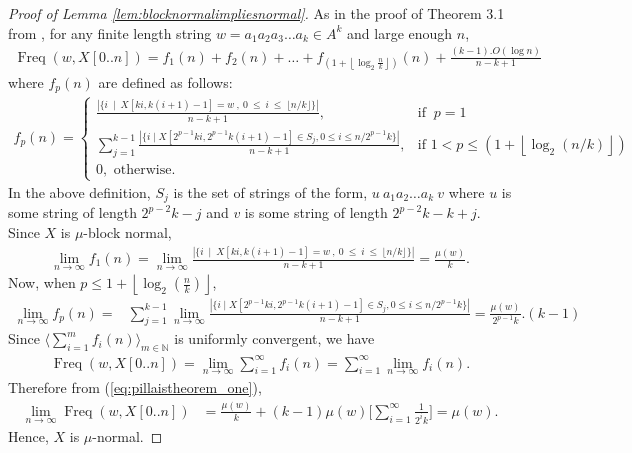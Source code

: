\documentclass[11pt]{article}
\DeclareMathOperator{\freq}{Freq}
\begin{document}
\begin{proof}[Proof of Lemma \ref{lem:blocknormalimpliesnormal}]
As in the proof of Theorem 3.1 from \cite{NandakumarPVV2021}, for any finite length string
	$w=a_1a_2a_3\dots a_k\in A^k$ and large enough $n$, 
	\begin{align}
		\label{eq:pillaistheorem_one}
		\freq(w,X[0..n])=
		f_1(n) + f_2(n) +\dots+
		f_{(1+\left \lfloor\log_2  \frac{n}{k} \right \rfloor)}(n) + {\frac{(k-1). O(\log n) }{n-k+1}}
	\end{align}
	where $f_p(n)$ are defined as follows:
	\begin{align*}
		f_{p}(n)= \begin{cases}
		\frac{	|\{i~ \mid~ X[ki,k(i+1)-1]=w
				~,~ 0 ~\leq ~i ~\leq ~\lfloor n/k \rfloor \}|}{n-k+1}, & \text{if } ~p=1\\
			\sum_{j=1}^{k-1}\frac{  |\{i \mid X[2^{p-1}ki,2^{p-1}k(i+1)-1] \in S_j
				, 0 \leq i \leq n/2^{p-1}k \}|}{n-k+1}, &\text{if } 1<p \leq
			(1+\left \lfloor\log_2(n/k)\right \rfloor)\\ 
			0, \text{ otherwise.}
		\end{cases}
	\end{align*}
	In the above definition, $S_{j}$ is the set of strings of the form,
	$u\ a_1a_2 \dots a_k\ v$ where $u$ is some string of length $2^{p-2}k-j$ and $v$ is some string of length $2^{p-2}k-k+j$. 
	Since $X$ is $\mu$-block normal, 
	\begin{align*}
		\lim_{n\to\infty} f_1(n) = \lim_{n\to\infty}\frac{	|\{i~ \mid~ X[ki,k(i+1)-1]=w
				~,~ 0 ~\leq ~i ~\leq ~\lfloor n/k \rfloor \}|}{n-k+1} =
	\frac{\mu(w)}{k}.
	\end{align*}
	Now, when $p \leq 1+ \left\lfloor\log_2(\frac{n}{k}) \right\rfloor$,
	\begin{align*}
		\lim_{n\to\infty} f_p(n)
		=&  \sum_{j =1}^{k-1}\lim_{n\to\infty}
		\frac{  |\{i \mid X[2^{p-1}ki,2^{p-1}k(i+1)-1] \in S_j
				, 0 \leq i \leq n/2^{p-1}k \}|}{n-k+1}= \frac{\mu(w)}{2^{p-1}k}.(k-1)
	\end{align*}
	Since
	$\langle \sum_{i=1}^{m} f_i(n) \rangle_{m \in \mathbb{N}}$ is uniformly
	convergent, we have
\begin{align*}
		\freq(w,X[0..n]) = \lim_{n\to\infty} \sum_{i=1}^{\infty} f_{i}(n)=  \sum_{i=1}^{\infty} \lim_{n\to\infty} f_{i}(n).
	\end{align*}
	Therefore from (\ref{eq:pillaistheorem_one}),
	\begin{align*}
		\lim_{n\to\infty} \freq(w,X[0..n])
		&= \frac{\mu(w)}{k} + (k-1)\mu(w) \Big[ \sum_{i=1}^\infty \frac{1}{2^i k} \Big] = \mu(w).
	\end{align*}
	Hence, $X$ is $\mu$-normal.
\end{proof}
\end{document}
